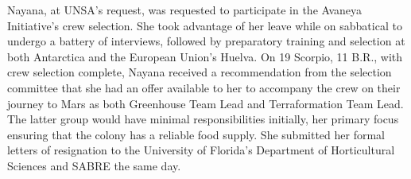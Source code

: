 Nayana, at UNSA's request, was requested to participate in the Avaneya Initiative's crew selection. She took advantage of her leave while on sabbatical to undergo a battery of interviews, followed by preparatory training and selection at both Antarctica and the European Union's Huelva. On 19 Scorpio, 11 B.R., with crew selection complete, Nayana received a recommendation from the selection committee that she had an offer available to her to accompany the crew on their journey to Mars as both Greenhouse Team Lead and Terraformation Team Lead. The latter group would have minimal responsibilities initially, her primary focus ensuring that the colony has a reliable food supply. She submitted her formal letters of resignation to the University of Florida's Department of Horticultural Sciences and SABRE the same day.

